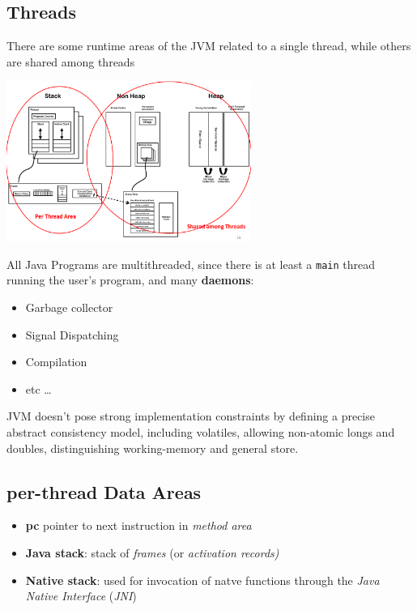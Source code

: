 \subsection{Threads}
There are some runtime areas of the JVM related to a single thread, while others are shared among threads

\begin{center}
    \includegraphics[width=0.6\textwidth]{images/JVM_Runtime_areas.png}
\end{center}
All Java Programs are multithreaded, since there is at least a \lstinline{main} thread running the user's program, and many \textbf{daemons}:
\begin{itemize}
    \item Garbage collector
    \item Signal Dispatching
    \item Compilation
    \item etc \dots
\end{itemize}
JVM doesn't pose strong implementation constraints by defining a precise abstract consistency model, including volatiles, allowing non-atomic longs and doubles, distinguishing working-memory and general store.


\subsection{per-thread Data Areas}
\begin{itemize}
    \item \textbf{pc} pointer to next instruction in \textit{method area}
    \item \textbf{Java stack}: stack of \textit{frames} (or \textit{activation records)}
    \item \textbf{Native stack}: used for invocation of natve functions through the \textit{Java Native Interface} (\textit{JNI})
\end{itemize}

